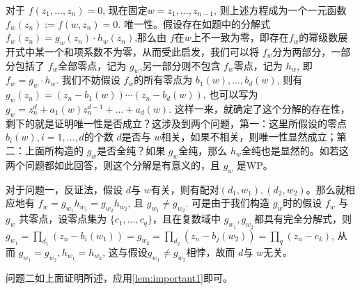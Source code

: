 \documentclass[lang=cn,12pt,a4paper,fontset=none]{beautybook}
\begin{document}
\begin{remark}
   对于 $f(z_1,\dots,z_n)=0$, 现在固定$w=z_1,\dots,z_{n-1}$, 则上述方程成为一个一元函数$f_w (z_n):=f(w,z_n)=0$. 唯一性。假设存在如题中的分解式 $f_w(z_n)=g_w(z_n)\cdot h_w(z_n)$,那么由 $f$在$w$上不一致为零，即存在$f_w$的幂级数展开式中某一个和项系数不为零，从而受此启发，我们可以将 $f_w$分为两部分，一部分包括了 $f_w$全部零点，记为 $g_w$,另一部分则不包含 $f_w$零点，记为 $h_w$, 即 $f_w=g_w\cdot h_w$. 我们不妨假设 $f_w$的所有零点为 $b_1(w),\dots,b_d(w)$, 则有 $g_w(z_n)=(z_n-b_1(w))\cdots (z_n-b_d(w))$, 也可以写为 $g_w=z_n^d+a_1(w) z_n^{d-1}+\dots+a_d(w)$. 这样一来，就确定了这个分解的存在性，剩下的就是证明唯一性是否成立？这涉及到两个问题，第一：这里所假设的零点 $b_i(w),i=1,\dots,d$的个数 $d$是否与 $w$相关，如果不相关，则唯一性显然成立；第二：上面所构造的 $g_w$是否全纯？如果 $g_w$全纯，那么 $h_w$全纯也是显然的。如若这两个问题都如此回答，则这个分解是有意义的，且 $g_w$ 是WP。

   对于问题一，反证法，假设 $d$与 $w$有关，则有配对$(d_1,w_1), (d_2,w_2)$。那么就相应地有 $f_w=g_{w_1} h_{w_1}=g_{w_2}h_{w_2}$, 且 $g_{w_1}\neq g_{w_2}$.  可是由于我们构造 $g_w$时的假设 $f_w$ 与 $g_w$ 共零点，设零点集为 $\{c_1,\dots,c_q\}$，且在复数域中 $g_{w_1},g_{w_2}$都具有完全分解式，则 $g_{w_1}=\prod_{d_1}(z_n-b_i(w_1))= g_{w_2}=\prod_{d_2}(z_n-b_j(w_2))=\prod_{q}(z_n-c_k)$, 从而 $g_{w_1}=g_{w_2}, h_{w_1}=h_{w_2}$, 这与假设$g_{w_1}\neq g_{w_2}$相悖，故而 $d$与 $w$无关。

   问题二如上面证明所述，应用\autoref{lem:important1}即可。
\end{remark}
\end{document}
